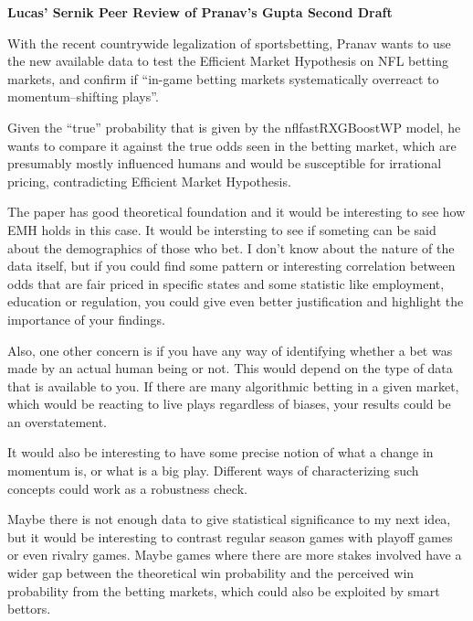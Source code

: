 \documentclass[12pt, a4paper]{article}
\begin{document}
\begin{center}
{\large \textbf{Lucas' Sernik Peer Review of Pranav's Gupta Second Draft}}
\end{center}

\vspace{1cm}

With the recent countrywide legalization of sportsbetting, Pranav wants to use the new available data to test the Efficient Market Hypothesis on NFL betting markets, and confirm if ``in-game betting markets systematically overreact to momentum--shifting plays''.

Given the ``true'' probability that is given by the nflfastRXGBoostWP model, he wants to compare it against the true odds seen in the betting market, which are presumably mostly influenced humans and would be susceptible for irrational pricing, contradicting Efficient Market Hypothesis.


The paper has good theoretical foundation and it would be interesting to see how EMH holds in this case. It would be intersting to see if someting can be said about the demographics of those who bet. I don't know about the nature of the data itself, but if you could find some pattern or interesting correlation between odds that are fair priced in specific states and some statistic like employment, education or regulation, you could give even better justification and highlight the importance of your findings.

Also, one other concern is if you have any way of identifying whether a bet was made by an actual human being or not. This would depend on the type of data that is available to you. If there are many algorithmic betting in a given market, which would be reacting to live plays regardless of biases, your results could be an overstatement.

It would also be interesting to have some precise notion of what a change in momentum is, or what is a big play. Different ways of characterizing such concepts could work as a robustness check.

Maybe there is not enough data to give statistical significance to my next idea, but it would be interesting to contrast regular season games with playoff games or even rivalry games. Maybe games where there are more stakes involved have a wider gap between the theoretical win probability and the perceived win probability from the betting markets, which could also be exploited by smart bettors.
\end{document}

